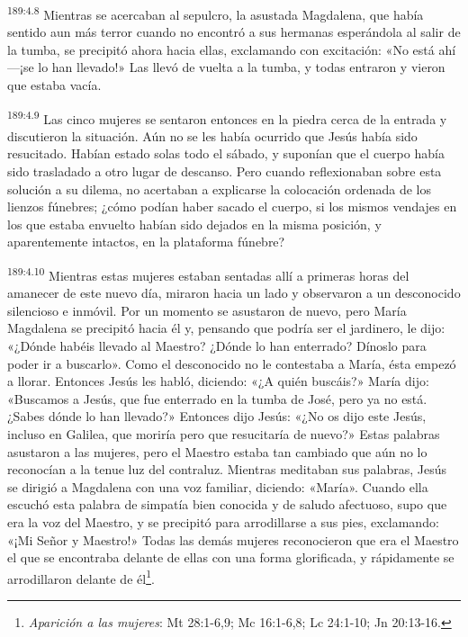 \par 
\textsuperscript{189:4.8} Mientras se acercaban al sepulcro, la asustada Magdalena, que había sentido aun más terror cuando no encontró a sus hermanas esperándola al salir de la tumba, se precipitó ahora hacia ellas, exclamando con excitación: «No está ahí ---¡se lo han llevado!» Las llevó de vuelta a la tumba, y todas entraron y vieron que estaba vacía.

\par 
\textsuperscript{189:4.9} Las cinco mujeres se sentaron entonces en la piedra cerca de la entrada y discutieron la situación. Aún no se les había ocurrido que Jesús había sido resucitado. Habían estado solas todo el sábado, y suponían que el cuerpo había sido trasladado a otro lugar de descanso. Pero cuando reflexionaban sobre esta solución a su dilema, no acertaban a explicarse la colocación ordenada de los lienzos fúnebres; ¿cómo podían haber sacado el cuerpo, si los mismos vendajes en los que estaba envuelto habían sido dejados en la misma posición, y aparentemente intactos, en la plataforma fúnebre?

\par 
\textsuperscript{189:4.10} Mientras estas mujeres estaban sentadas allí a primeras horas del amanecer de este nuevo día, miraron hacia un lado y observaron a un desconocido silencioso e inmóvil. Por un momento se asustaron de nuevo, pero María Magdalena se precipitó hacia él y, pensando que podría ser el jardinero, le dijo: «¿Dónde habéis llevado al Maestro? ¿Dónde lo han enterrado? Dínoslo para poder ir a buscarlo». Como el desconocido no le contestaba a María, ésta empezó a llorar. Entonces Jesús les habló, diciendo: «¿A quién buscáis?» María dijo: «Buscamos a Jesús, que fue enterrado en la tumba de José, pero ya no está. ¿Sabes dónde lo han llevado?» Entonces dijo Jesús: «¿No os dijo este Jesús, incluso en Galilea, que moriría pero que resucitaría de nuevo?» Estas palabras asustaron a las mujeres, pero el Maestro estaba tan cambiado que aún no lo reconocían a la tenue luz del contraluz. Mientras meditaban sus palabras, Jesús se dirigió a Magdalena con una voz familiar, diciendo: «María». Cuando ella escuchó esta palabra de simpatía bien conocida y de saludo afectuoso, supo que era la voz del Maestro, y se precipitó para arrodillarse a sus pies, exclamando: «¡Mi Señor y Maestro!» Todas las demás mujeres reconocieron que era el Maestro el que se encontraba delante de ellas con una forma glorificada, y rápidamente se arrodillaron delante de él\footnote{\textit{Aparición a las mujeres}: Mt 28:1-6,9; Mc 16:1-6,8; Lc 24:1-10; Jn 20:13-16.}.


